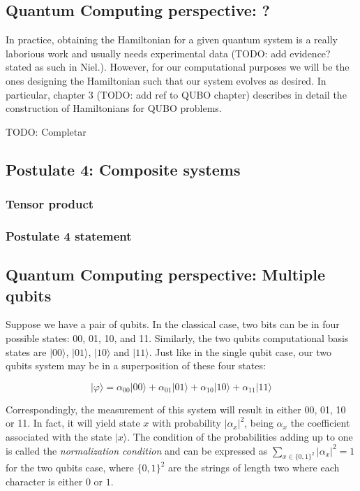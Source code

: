 \documentclass{article}
\begin{document}
	
	\subsection{Quantum Computing perspective: ?}
	
	In practice, obtaining the Hamiltonian for a given quantum system is a really laborious work and usually needs experimental data (TODO: add evidence? stated as such in Niel.). However, for our computational purposes we will be the ones designing the Hamiltonian such that our system evolves as desired. In particular, chapter 3 (TODO: add ref to QUBO chapter) describes in detail the construction of Hamiltonians for QUBO problems.
	
	TODO: Completar
	
	
	\subsection{Postulate 4: Composite systems}
	
	\subsubsection{Tensor product}
	
	\subsubsection{Postulate 4 statement}
	
	
	\subsection{Quantum Computing perspective: Multiple qubits}
	
	
	Suppose we have a pair of qubits. In the classical case, two bits can be in four possible states: 00, 01, 10, and 11. Similarly, the two qubits computational basis states are $|00\rangle$, $|01\rangle$, $|10\rangle$ and $|11\rangle$. Just like in the single qubit case, our two qubits system may be in a superposition of these four states:
	
	$$ |\varphi\rangle = \alpha_{00} |00\rangle + \alpha_{01} |01\rangle + \alpha_{10} |10\rangle + \alpha_{11} |11\rangle $$
	
	Correspondingly, the measurement of this system will result in either 00, 01, 10 or 11. In fact, it will yield state $x$ with probability $|\alpha_x|^2$, being $\alpha_x$ the coefficient associated with the state $|x\rangle$. The condition of the probabilities adding up to one is called the \emph{normalization condition} and can be expressed as $\sum_{x \in \{0,1\}^2} |\alpha_x|^2 = 1$ for the two qubits case, where $\{0,1\}^2$ are the strings of length two where each character is either $0$ or $1$.
	
\end{document}
